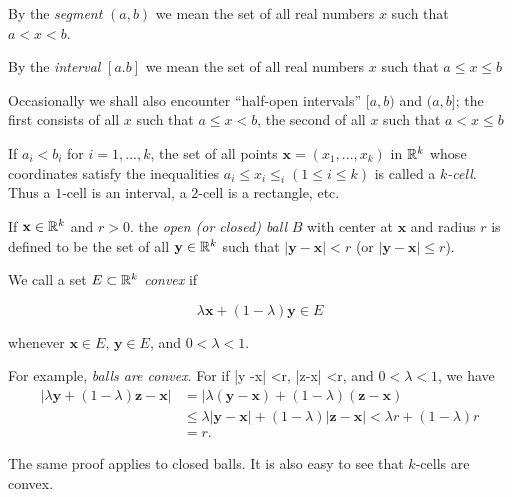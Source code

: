 \begin{myDef}\label{myDef:2.17}
By the \emph{segment} $(a, b)$ we mean the set of all real numbers $x$
such that $a < x <b$.

By the \emph{interval} $[a. b]$ we mean the set of all real numbers $x$ such that $a \leq x \leq b$

Occasionally we shall also encounter ``half-open intervals'' $[a, b)$ and $(a, b]$; the first consists of all $x$ such that $a \leq x < b$, the second of all $x$ such that $a < x \leq b$
\end{myDef}

If $a_i <b_i$ for $i=1,...,k$, the set of all points $\mathbf{x} =(x_1, ..., x_k)$ in ${\protect\mathbb R}^k$ whose coordinates satisfy the inequalities $a_i \leq x_i \leq _i (1 \leq i \leq k)$ is called a \emph{$k$-cell}.\\
Thus a $1$-cell is an interval, a $2$-cell is a rectangle, etc.

If $\mathbf{x}\in {\protect\mathbb R}^k$ and $r > 0$. the \emph{open (or closed) ball} $B$ with center at $\mathbf{x}$ and radius $r$ is defined to be the set of all $\mathbf{y} \in {\protect\mathbb R}^k$ such that $|\mathbf{y} - \mathbf{x}| <r$ (or $|\mathbf{y} - \mathbf{x}| \leq r$).

We call a set $E \subset {\protect\mathbb R}^k$ \emph{convex} if

\begin{equation*}
    \lambda\mathbf{x} + (1 - \lambda)\mathbf{y} \in E
\end{equation*}

whenever $\mathbf{x} \in E$, $\mathbf{y} \in E$, and $0 < \lambda < 1$.

For example, \emph{balls are convex}. For if |y -x| <r, |z-x| <r, and
$0 < \lambda <1$, we have
\begin{align*}
    |\lambda \mathbf{y} + (1-\lambda) \mathbf{z} - \mathbf{x}|
    & = |\lambda (\mathbf{y} - \mathbf{x}) + (1 - \lambda)(\mathbf{z} - \mathbf{x})\\
    & \leq \lambda |\mathbf{y} - \mathbf{x}| + (1 - \lambda)|\mathbf{z} - \mathbf{x}| < \lambda r + (1 - \lambda)r\\
    & = r.
\end{align*}

The same proof applies to closed balls. It is also easy to see that $k$-cells are convex.


